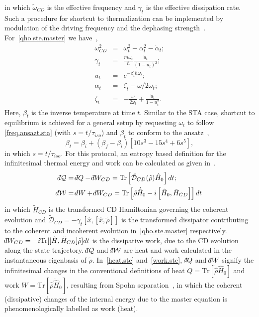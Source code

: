 \documentclass[aps,pra,twocolumn,showpacs,showkeys,groupedaddress,nobalancelastpage,nofootinbib,floatfix,superscriptaddress,longbibliography]{revtex4-2}
\begin{document}
in which $\tilde{\omega}_{CD}$ is the effective frequency and $\gamma_t$ is the effective dissipation rate. Such a procedure for shortcut to thermalization can be implemented by modulation of the driving frequency and the dephasing strength~\cite{Alipour2020shortcutsto,PhysRevResearch.2.033178}. For~\cref{qho.ste.master} we have~\cite{Alipour2020shortcutsto},
\begin{eqnarray}\label{qho.ste.param}
  \omega_{CD}^2 &=& \omega_t^2 - \alpha_t^2 - \dot{\alpha}_t; \\
  \gamma_t &=& \frac{m\omega_t}{\hbar}\frac{\dot{u}_t}{(1-u_t)^2}; \\
   u_t &=& e^{-\beta_t \hbar \omega_t}; \\
   \alpha_t &=& \zeta_t - \dot{\omega}/2\omega_t; \\
   \zeta_t &=& -\frac{\dot{\omega}}{2\omega_t} + \frac{\dot{u}_t}{1-u_t^2}.
\end{eqnarray}
Here, $\beta_t$ is the inverse temperature at time $t$. Similar to the STA case, shortcut to equilibrium is achieved for a general setup by requesting $\omega_t$ to follow \cref{freq.ansazt.sta} (with $s=t/\tau_{iso}$) and $\beta_t$ to conform to the ansatz~\cite{Alipour2020shortcutsto},
\begin{equation}\label{beta.ansazt.ste}
   \beta_t = \beta_i + (\beta_f - \beta_i)[10s^3-15s^4+6s^5],
\end{equation}
in which $s=t/\tau_{iso}$. For this protocol, an entropy based definition for the infinitesimal thermal energy and work can be calculated as given in~\cite{PhysRevA.105.L040201}.
\begin{align}
    \dbar\mathcal{Q} &= \dbar Q - \dbar W_{CD} = \text{Tr}\left[\tilde{\mathcal{D}}_{CD}(\tilde{\rho}) \hat{H}_0 \right]dt;\label{heat.ste}\\
    \dbar\mathcal{W} &= \dbar W + \dbar W_{CD} = \text{Tr}\left[\tilde{\rho}\dot{\hat{H}}_0-i\left[\hat{H}_0,\tilde{H}_{CD} \right] \right]dt\label{work.ste}
\end{align}
in which $\tilde{H}_{CD}$ is the transformed CD Hamiltonian governing the coherent evolution and $\tilde{\mathcal{D}}_{CD}=-\gamma_t \left[\hat{x},\left[\hat{x},\tilde{\rho}\right]\right]$ is the transformed dissipator contributing to the coherent and incoherent evolution in~\cref{qho.ste.master} respectively. $\dbar W_{CD}=-i\text{Tr}[[\hat{H},\tilde{H}_{CD}] \tilde{\rho}]dt$ is the dissipative work, due to the CD evolution along the state trajectory. $\dbar\mathcal{Q}$ and $\dbar\mathcal{W}$ are heat and work calculated in the instantaneous eigenbasis of $\tilde{\rho}$. In~\cref{heat.ste} and~\cref{work.ste}, $\dbar Q$ and $\dbar W$ signify the infinitesimal changes in the conventional definitions of heat $Q=\text{Tr}[\dot{\hat{\rho}}\hat{H}_0]$ and work $W=\text{Tr}[\hat{\rho}\dot{\hat{H}}_0]$, resulting from Spohn separation~\cite{10.1063/1.523789}, in which the coherent (dissipative) changes of the internal energy due to the master equation is phenomenologically labelled as work (heat).\\
\end{document}
